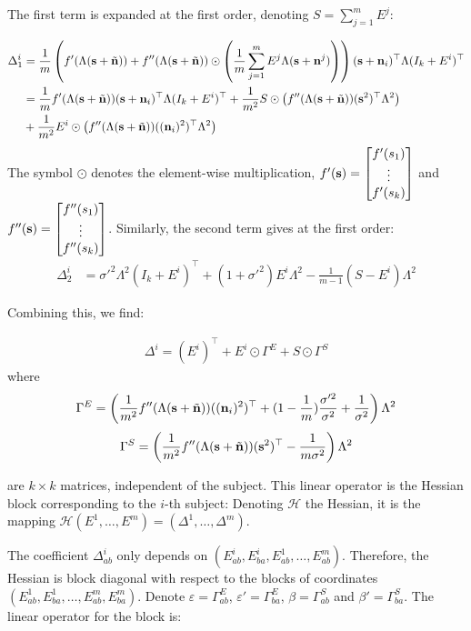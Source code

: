 \documentclass[12pt]{report}
\begin{document}
The first term is expanded at the first order, denoting $S = \sum_{j=1}^m E^j$:

\begin{align}
    \Delta_1^i &= \frac1m \left(f'(\Lambda(\mathbf{s} + \tilde{\mathbf{n}})) + f''(\Lambda(\mathbf{s} + \tilde{\mathbf{n}}))\odot \left(\frac1m \sum_{j=1}^m E^j\Lambda(\mathbf{s} +\mathbf{n}^j)\right)\right)(\mathbf{s} +\mathbf{n}_i)^{\top}\Lambda(I_k + E^i)^{\top}\\
    &=\frac1m f'(\Lambda(\mathbf{s} + \tilde{\mathbf{n}}))(\mathbf{s} + \mathbf{n}_i)^{\top}\Lambda(I_k + E^i)^{\top} + \frac1{m^2}S\odot  \left(f''(\Lambda(\mathbf{s} + \tilde{\mathbf{n}}))(\mathbf{s}^2)^{\top}\Lambda^2 \right)\\
    &+\frac{1}{m^2}E^i\odot\left(f''(\Lambda(\mathbf{s} + \tilde{\mathbf{n}}))((\mathbf{n}_i)^2)^{\top}\Lambda^2 \right)
\end{align}
The symbol $\odot$ denotes the element-wise multiplication, $f'(\mathbf{s}) = \begin{bmatrix}f'(s_1) \\ \vdots \\ f'(s_k) \end{bmatrix}$ and $f''(\mathbf{s}) = \begin{bmatrix}f''(s_1) \\ \vdots \\ f''(s_k) \end{bmatrix}$.
Similarly, the second term gives at the first order: 
\begin{align}
    \Delta_2^i &= \sigma'^2\Lambda^2(I_k + E^i)^{\top} + (1 + \sigma'^2)E^i\Lambda^2 - \frac{1}{m-1} (S - E^i) \Lambda^2
\end{align}

Combining this, we find:

\begin{align}
 \Delta^i = (E^i)^{\top} + E^i \odot\Gamma^E
 +S\odot \Gamma^S
\end{align}
where 
$$
\Gamma^E= \left(\frac1{m^2}f''(\Lambda(\mathbf{s} + \tilde{\mathbf{n}}))((\mathbf{n}_i)^2)^{\top} + (1-\frac1m)\frac{\sigma'^2}{\sigma^2} + \frac{1}{\sigma^2} \right)\Lambda^2
$$
$$
\Gamma^S =\left(\frac1{m^2}f''(\Lambda(\mathbf{s} + \tilde{\mathbf{n}}))(\mathbf{s}^2)^{\top} -\frac{1}{m\sigma^2}  \right)\Lambda^2
$$

are $k\times k$ matrices, independent of the subject.
This linear operator is the Hessian block corresponding to the $i$-th subject:
Denoting $\mathcal{H}$ the Hessian, it is the mapping $\mathcal{H}(E^1, \dots, E^m) = (\Delta^1, \dots, \Delta^m)$.

The coefficient $\Delta^i_{ab}$ only depends on $(E^i_{ab}, E^i_{ba}, E^1_{ab},\dots, E^m_{ab})$. Therefore, the Hessian is block diagonal with respect to the blocks of coordinates $(E^1_{ab}, E^1_{ba}, \dots, E^m_{ab}, E^m_{ba})$. Denote $\varepsilon = \Gamma^E_{ab}$, $\varepsilon' = \Gamma^E_{ba}$, $\beta = \Gamma^S_{ab}$ and $\beta'= \Gamma^S_{ba}$. The linear operator for the block is:
\end{document}
